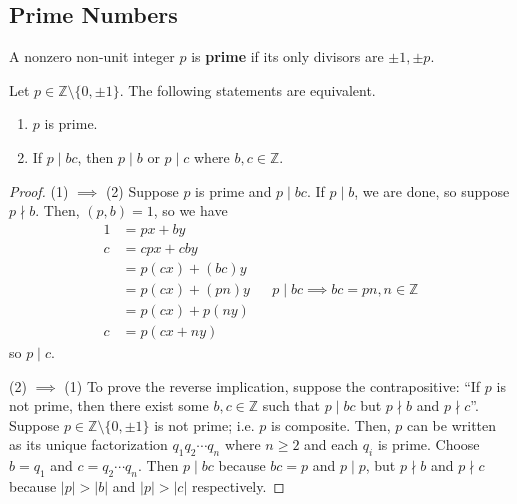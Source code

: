 \documentclass [12pt] {article}
\newcommand{\Z}{\mathbb{Z}}
\newenvironment{definition}[1]{\begin{tcolorbox}[title={Definition: #1},colback=blue!5!white,colframe=black!75!blue]}{\end{tcolorbox}}
\newenvironment{theorem}[1]{\begin{tcolorbox}[title={Theorem #1},colback=green!5!white,colframe=black!75!green]}{\end{tcolorbox}}
\renewcommand{\bf}[1]{\textbf{{#1}}}
\begin{document}
\subsection{Prime Numbers}
\begin{definition}{Prime}
    A nonzero non-unit integer $p$ is \bf{prime} if its only divisors are $\pm 1, \pm p$.
\end{definition}
 
\begin{theorem}{}
    Let $p \in \Z \setminus \{0, \pm 1\}$. The following statements are equivalent.
    \begin{enumerate}[label=(\arabic*)]
        \item $p$ is prime.
        \item If $p \mid bc$, then $p \mid b$ or $p \mid c$ where $b, c \in \Z$.
    \end{enumerate}
\end{theorem}
\begin{proof}
    (1) $\implies$ (2)
    Suppose $p$ is prime and $p \mid bc$. If $p \mid b$, we are done, so suppose $p \nmid b$. Then,
    $(p, b) = 1$, so we have
    \begin{align*}
        1 &= px + by \\ 
        c &= cpx + cby \\
          &= p(cx) + (bc)y \\
          &= p(cx) + (pn)y && p \mid bc \implies bc = pn, n \in \Z \\
          &= p(cx) + p(ny) \\
        c &= p(cx + ny)
    \end{align*}
    so $p \mid c$.
    \vspace{0.5em}

    (2) $\implies$ (1) 
    To prove the reverse implication, suppose the contrapositive: ``If $p$ is not prime, then there
    exist some $b, c \in \Z$ such that $p \mid bc$ but $p \nmid b$ and $p \nmid c$''. Suppose 
    $p \in \Z \setminus \{ 0, \pm 1 \}$ is not prime; i.e. $p$ is composite. Then, $p$ can be
    written as its unique factorization $q_1 q_2 \cdots q_n$ where $n \geq 2$ and each $q_i$ is
    prime. Choose $b = q_1$ and $c = q_2 \cdots q_n$. Then $p \mid bc$ because $bc = p$ and 
    $p \mid p$, but $p \nmid b$ and $p \nmid c$ because $|p| > |b|$ and $|p| > |c|$ respectively.
\end{proof}
\end{document}
